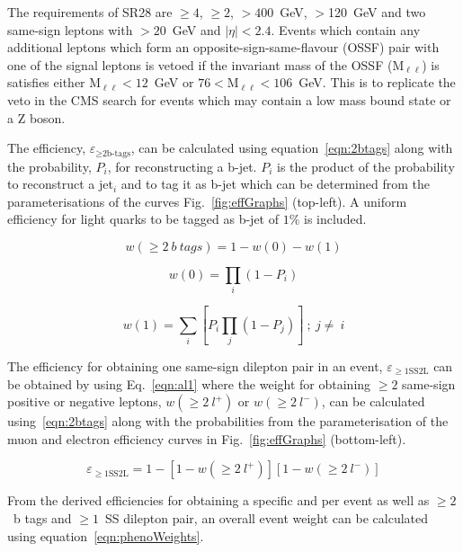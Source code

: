 The requirements of SR28 are \njets$\geq4$, \nbtags$\geq2$, \HT$>400$~GeV, \MET$>$120~GeV and two same-sign leptons with \pt$>20$~GeV and $|\eta|<2.4$. Events which contain any additional leptons which form an opposite-sign-same-flavour (OSSF) pair with one of the signal leptons is vetoed if the invariant mass of the OSSF (M$_{\ell\ell}$) is satisfies either M$_{\ell\ell}<12$~GeV or $76<$M$_{\ell\ell}<106$~GeV. This is to replicate the veto in the CMS search for events which may contain a low mass bound state or a Z boson.

The efficiency, $\varepsilon_{\geq\text{2b-tags}}$, can be calculated using equation~\ref{eqn:2btags} along with the probability, $P_{i}$, for reconstructing a b-jet. $P_{i}$ is the product of the probability to reconstruct a jet$_{i}$ and to tag it as b-jet which can be determined from the parameterisations of the curves Fig.~\ref{fig:effGraphs} (top-left). A uniform efficiency for light quarks to be tagged as b-jet of $1\%$ is included.


\begin{equation}
w(\geq2~b~tags) = 1 - w(0) - w(1)
\label{eqn:2btags}
\end{equation}

\begin{equation}
w(0) = \prod_{i} ( 1 - P_{i})
\label{eqn:0btags}
\end{equation}


\begin{equation}
w(1) = \sum_{i}\left[P_{i}\prod_{j} ( 1 - P_{j})\right]~;~j\neq~i
\label{eqn:1btags}
\end{equation}

The efficiency for obtaining one same-sign dilepton pair in an event, $\varepsilon_{\geq1 \text{SS2L}}$ can be obtained by using Eq.~\ref{eqn:al1} where the weight for obtaining $\geq2$ same-sign positive or negative leptons, $ w(\geq2~l^{+})$ or  $ w(\geq2~l^{-})$, can be calculated using~\ref{eqn:2btags} along with the probabilities from the parameterisation of the muon and electron efficiency curves in Fig.~\ref{fig:effGraphs} (bottom-left).

\begin{equation}
\varepsilon_{\geq1 \text{SS2L}} = 1 - \left[1-w(\geq2~l^{+})\right]\left[1-w(\geq2~l^{-})\right]
\label{eqn:al1}
\end{equation}

From the derived efficiencies for obtaining a specific \HT and \MET per event as well as $\geq2$~b tags and $\geq1$~SS dilepton pair, an overall event weight can be calculated using equation~\ref{eqn:phenoWeights}.

